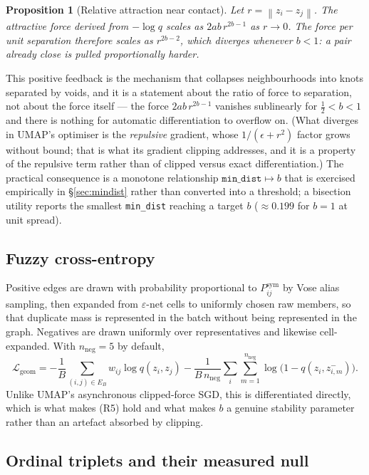 \documentclass[12pt]{iopart}
\theoremstyle{definition}
\theoremstyle{plain}
\newtheorem{proposition}{Proposition}
\theoremstyle{remark}
\newcommand{\norm}[1]{\left\lVert#1\right\rVert}
\newcommand{\loss}{\mathcal{L}}
\newcommand{\code}[1]{\texttt{#1}}
\begin{document}
\begin{proposition}[Relative attraction near contact]
\label{prop:bstab}
Let $r=\norm{z_i-z_j}$. The attractive force derived from $-\log q$ scales as
$2ab\,r^{2b-1}$ as $r\to0$. The force \emph{per unit separation} therefore
scales as $r^{2b-2}$, which diverges whenever $b<1$: a pair already close is
pulled proportionally harder.
\end{proposition}

This positive feedback is the mechanism that collapses neighbourhoods into
knots separated by voids, and it is a statement about the ratio of force to
separation, not about the force itself --- the force $2ab\,r^{2b-1}$ vanishes
sublinearly for $\tfrac12<b<1$ and there is nothing for automatic
differentiation to overflow on. (What diverges in UMAP's optimiser is the
\emph{repulsive} gradient, whose $1/(\epsilon+r^2)$ factor grows without bound;
that is what its gradient clipping addresses, and it is a property of the
repulsive term rather than of clipped versus exact differentiation.) The
practical consequence is a monotone relationship $\code{min\_dist}\mapsto b$
that is exercised empirically in \S\ref{sec:mindist} rather than converted into
a threshold; a bisection utility reports the smallest \code{min\_dist} reaching
a target $b$ ($\approx 0.199$ for $b=1$ at unit spread).

\subsection{Fuzzy cross-entropy}
\label{sec:geom}

Positive edges are drawn with probability proportional to
$P^{\mathrm{sym}}_{ij}$ by Vose alias sampling, then expanded from
$\varepsilon$-net cells to uniformly chosen raw members, so that duplicate mass
is represented in the batch without being represented in the graph. Negatives
are drawn uniformly over representatives and likewise cell-expanded. With
$n_{\mathrm{neg}}=5$ by default,
\begin{equation}
\label{eq:geom}
\loss_{\mathrm{geom}}
=
-\frac{1}{B}\sum_{(i,j)\in E_B} w_{ij}\log q(z_i,z_j)
-\frac{1}{B\,n_{\mathrm{neg}}}\sum_{i}\sum_{m=1}^{n_{\mathrm{neg}}}
\log\bigl(1-q(z_i,z^-_{i,m})\bigr).
\end{equation}
Unlike UMAP's asynchronous clipped-force SGD, this is differentiated directly,
which is what makes (R5) hold and what makes $b$ a genuine stability parameter
rather than an artefact absorbed by clipping.

\subsection{Ordinal triplets and their measured null}
\label{sec:ord}
\end{document}

